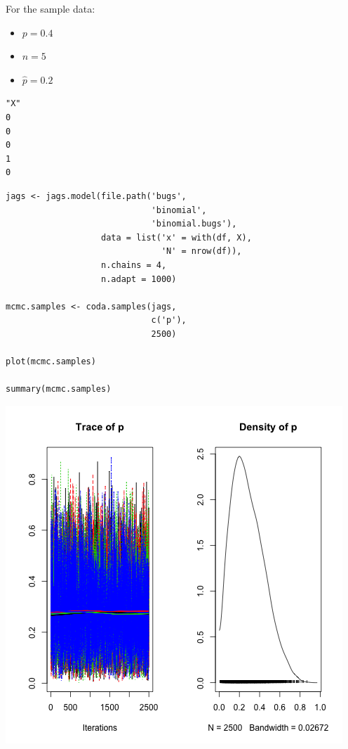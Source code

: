 \documentclass{beamer}
\begin{document}
\begin{frame}[fragile]
  For the sample data:
  \begin{itemize}
    \item{$p = 0.4$}
    \item{$n = 5$}
    \item{$\hat{p} = 0.2$}
  \end{itemize}
\end{frame}

\begin{frame}[fragile]
  \begin{verbatim}
"X"
0
0
0
1
0
  \end{verbatim}
\end{frame}

\begin{frame}[fragile]
  \begin{verbatim}
jags <- jags.model(file.path('bugs', 
                             'binomial',
                             'binomial.bugs'),
                   data = list('x' = with(df, X),
                               'N' = nrow(df)),
                   n.chains = 4,
                   n.adapt = 1000)
                   
mcmc.samples <- coda.samples(jags,
                             c('p'),
                             2500)

plot(mcmc.samples)

summary(mcmc.samples)
  \end{verbatim}
\end{frame}

\begin{frame}[fragile]
  \begin{center}
    \includegraphics[scale = 0.4]{../graphs/binomial/plot.png}
  \end{center}
\end{frame}
\end{document}
